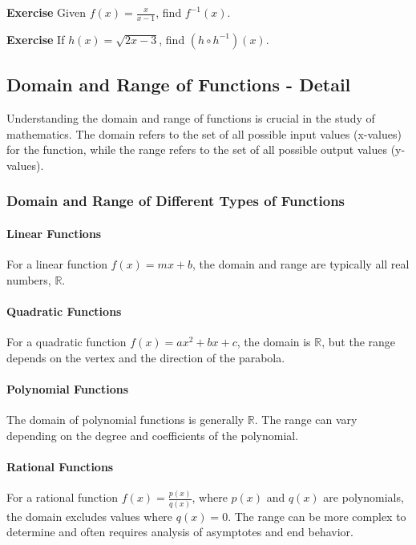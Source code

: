 \documentclass[a4paper,12pt]{book}
\newenvironment{exercise}[1][]
  {\par\medskip\noindent\textbf{Exercise #1} \rmfamily}
  {\medskip}
\begin{document}
\begin{exercise}
Given \( f(x) = \frac{x}{x - 1} \), find \( f^{-1}(x) \).
\end{exercise}

\begin{exercise}
If \( h(x) = \sqrt{2x - 3} \), find \( (h \circ h^{-1})(x) \).
\end{exercise}


\subsection{Domain and Range of Functions - Detail}
\label{subsec:domain_range_functions}
Understanding the domain and range of functions is crucial in the study of mathematics. The domain refers to the set of all possible input values (x-values) for the function, while the range refers to the set of all possible output values (y-values).

\subsubsection{Domain and Range of Different Types of Functions}
\paragraph{Linear Functions}
For a linear function \( f(x) = mx + b \), the domain and range are typically all real numbers, \( \mathbb{R} \).

\paragraph{Quadratic Functions}
For a quadratic function \( f(x) = ax^2 + bx + c \), the domain is \( \mathbb{R} \), but the range depends on the vertex and the direction of the parabola.

\paragraph{Polynomial Functions}
The domain of polynomial functions is generally \( \mathbb{R} \). The range can vary depending on the degree and coefficients of the polynomial.

\paragraph{Rational Functions}
For a rational function \( f(x) = \frac{p(x)}{q(x)} \), where \( p(x) \) and \( q(x) \) are polynomials, the domain excludes values where \( q(x) = 0 \). The range can be more complex to determine and often requires analysis of asymptotes and end behavior.
\end{document}
